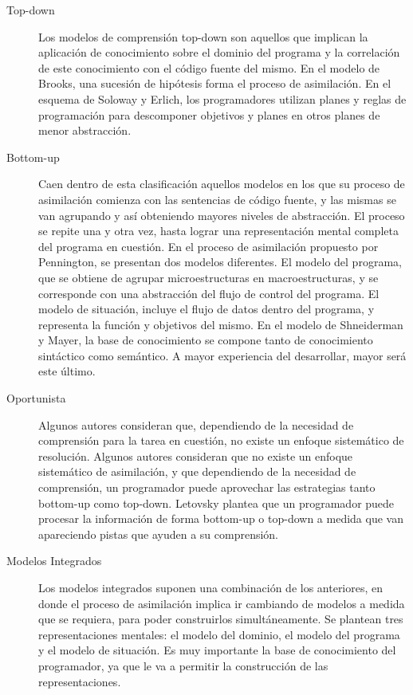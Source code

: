 \begin{description}
    \item[Top-down] Los modelos de comprensión top-down son aquellos que implican la
    aplicación de conocimiento sobre el dominio del programa y la correlación de este
    conocimiento con el código fuente del mismo.
    En el modelo de Brooks, una sucesión de hipótesis forma el proceso de asimilación.
    En el esquema de Soloway y Erlich, los programadores utilizan planes y reglas de programación
    para descomponer objetivos y planes en otros planes de menor abstracción.
     
    \item[Bottom-up] Caen dentro de esta clasificación aquellos modelos en
    los que su proceso de asimilación comienza con las sentencias de código fuente, y
    las mismas se van agrupando y así obteniendo mayores niveles de abstracción.
    El proceso se repite una y otra vez, hasta lograr una representación mental completa
    del programa en cuestión.
    En el proceso de asimilación propuesto por Pennington, se presentan dos modelos diferentes.
    El modelo del programa, que se obtiene de agrupar microestructuras en macroestructuras, y
    se corresponde con una abstracción del flujo de control del programa.
    El modelo de situación, incluye el flujo de datos dentro del programa, y representa la
    función y objetivos del mismo.
    En el modelo de Shneiderman y Mayer, la base de conocimiento se compone tanto de
    conocimiento sintáctico como semántico.
    A mayor experiencia del desarrollar, mayor será este último.

    \item[Oportunista] Algunos autores consideran que, dependiendo
    de la necesidad de comprensión para la tarea en cuestión, no existe un enfoque
    sistemático de resolución.
    Algunos autores consideran que no existe un enfoque sistemático de asimilación,
    y que dependiendo de la necesidad de comprensión, un programador puede aprovechar
    las estrategias tanto bottom-up como top-down.
    Letovsky plantea que un programador puede procesar la información de forma bottom-up
    o top-down a medida que van apareciendo pistas que ayuden a su comprensión.
    
    \item[Modelos Integrados] Los modelos integrados suponen una combinación de los
    anteriores, en donde el proceso de asimilación implica ir cambiando de
    modelos a medida que se requiera, para poder construirlos simultáneamente.
    Se plantean tres representaciones mentales: el modelo del dominio, el modelo del
    programa y el modelo de situación.
    Es muy importante la base de conocimiento del programador, ya que le va a permitir
    la construcción de las representaciones.

\end{description}

